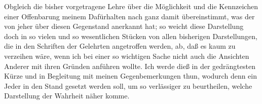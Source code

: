 Obgleich die bisher vorgetragene Lehre über die Möglichkeit und die Kennzeichen einer Offenbarung meinem Dafürhalten nach ganz damit übereinstimmt, was der  von jeher über diesen Gegenstand anerkannt hat; so weicht diese Darstellung doch in so vielen und so wesentlichen Stücken von allen bisherigen Darstellungen, die in den Schriften der Gelehrten angetroffen werden, ab, daß es kaum zu verzeihen wäre, wenn ich bei einer so wichtigen Sache nicht auch die Ansichten Anderer mit ihren Gründen anführen wollte. Ich werde dieß in der gedrängtesten Kürze und in Begleitung mit meinen Gegenbemerkungen thun, wodurch denn ein Jeder in den Stand gesetzt werden soll, um so verlässiger zu beurtheilen, welche Darstellung der Wahrheit näher komme.

